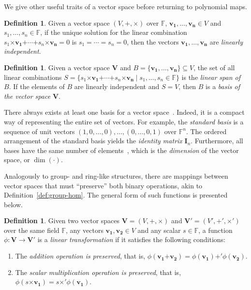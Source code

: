 \documentclass[english]{ufsc-thesis-rn46-2019/ufsc-thesis-rn46-2019}
\theoremstyle{definition}
\newtheorem{definition}[theorem]{Definition}
\begin{document}
We give other useful traits of a vector space before returning to polynomial
maps.

\begin{definition}
  Given a vector space $(V, \bm{+}, \bm{\times})$ over
  $\mathbb{F}$, $\mathbf{v_{1}}, \dots, \mathbf{v_{n}} \in V$ and
  $s_{1}, \dots, s_{n} \in \mathbb{F}$, if the unique solution for the linear
  combination
  $s_{1} \bm{\times} \mathbf{v_{1}} \bm{+}
    \cdots \bm{+} s_{n} \bm{\times} \mathbf{v_{n}} = 0$
  is $s_{1} = \cdots = s_{n} = 0$, then the vectors
  $\mathbf{v_{1}}, \dots, \mathbf{v_{n}}$ are \emph{linearly independent}.
\end{definition}

\begin{definition}
  Given a vector space $\mathbf{V}$ and
  $B = \{\mathbf{v_{1}}, \dots, \mathbf{v_{n}}\} \subseteq V$, the set of all
  linear combinations
  $S = \{ s_{1} \bm{\times} \mathbf{v_{1}} \bm{+}
    \cdots \bm{+} s_{n} \bm{\times} \mathbf{v_{n}}
      \mid s_{1}, \dots, s_{n} \in \mathbb{F} \}$ is the
  \emph{linear span of $B$}. If the elements of $B$ are linearly independent
  and $S = V$, then $B$ is a \emph{basis of the vector space $\mathbf{V}$}.
\end{definition}

There always exists at least one basis for a vector space~\cite[p.~409,
Prop.~1]{Dummit:2003}. Indeed, it is a compact way of representing the entire
set of vectors. For example, the \emph{standard basis} is a sequence of unit
vectors $(1, 0, \dots, 0), \dots, (0, \dots, 0, 1)$ over $\mathbb{F}^{n}$. The
ordered arrangement of the standard basis yields the \emph{identity matrix}
$\mathbf{I}_{n}$. Furthermore, all bases have the same number of
elements~\cite[p.~411, Cor.~4]{Dummit:2003}, which is the \emph{dimension} of
the vector space, or $\dim(\cdot)$.

Analogously to group- and ring-like structures, there are mappings between
vector spaces that must ``preserve'' both binary operations, akin to
Definition~\ref{def:group-hom}. The general form of such functions is presented
below.

\begin{definition}
  Given two vector spaces $\mathbf{V} = (V, \bm{+}, \bm{\times})$ and
  $\mathbf{V'} = (V', \bm{+'}, \bm{\times'})$ over the same field $\mathbb{F}$,
  any vectors $\mathbf{v_{1}}, \mathbf{v_{2}} \in V$ and any scalar
  $s \in \mathbb{F}$, a function $\phi : \mathbf{V} \to \mathbf{V'}$ is a
  \emph{linear transformation} if it satisfies the following conditions:

  \begin{enumerate}
    \item The \emph{addition operation is preserved}, that is,
      $\phi(\mathbf{v_{1}} \bm{+} \mathbf{v_{2}})
         = \phi(\mathbf{v_{1}}) \bm{+'} \phi(\mathbf{v_{2}})$.
    \item The \emph{scalar multiplication operation is preserved}, that is,
      $\phi(s \bm{\times} \mathbf{v_{1}})
        = s \bm{\times'} \phi(\mathbf{v_{1}})$.
  \end{enumerate}
\end{definition}
\end{document}
